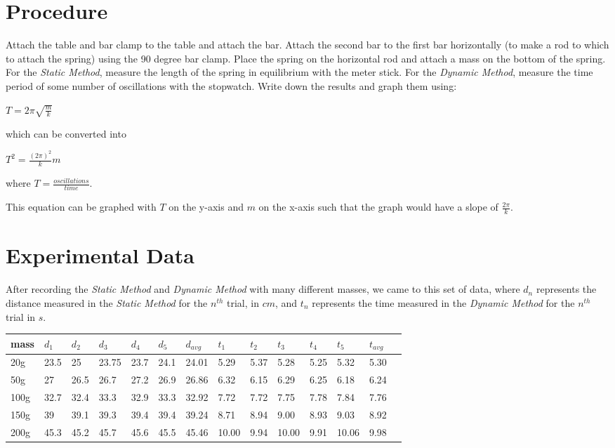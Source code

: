 \documentclass{article}
\begin{document}
\section{Procedure}
Attach the table and bar clamp to the table and attach the bar. Attach the second bar to the first bar horizontally (to make a rod to which to attach the spring) using the 90 degree bar clamp. Place the spring on the horizontal rod and attach a mass on the bottom of the spring. For the \emph{Static Method}, measure the length of the spring in equilibrium with the meter stick. For the \emph{Dynamic Method}, measure the time period of some number of oscillations with the stopwatch. Write down the results and graph them using:

\begin{center}$T=2\pi\sqrt{\frac{m}{k}}$\end{center}

	which can be converted into
	
\begin{center}$T^{2}=\frac{(2\pi)^{2}}{k}m$\end{center}

where $T=\frac{oscillations}{time}$.

This equation can be graphed with $T$ on the y-axis and $m$ on the x-axis such that the graph would have a slope of $\frac{2\pi}{k}$.

\section{Experimental Data}
After recording the \emph{Static Method} and \emph{Dynamic Method} with
	many different masses, we came to this set of data, where $d_{n}$ represents the distance measured in the \emph{Static Method} for the $n^{th}$ trial, in $cm$, and $t_{n}$ represents the time measured in the \emph{Dynamic Method} for the $n^{th}$  trial in $s$.

\begin{center}
\begin{table}[h]
\begin{tabular}{|l|l|l|l|l|l|l|l|l|l|l|l|l|l|}
\hline
mass & $d_1$ & $d_2$ & $d_3$ & $d_4$ & $d_5$ & $d_{avg}$ & $t_1$ & $t_2$ & $t_3$ & $t_4$ & $t_5$ & $t_{avg}$ \\ \hline 
20g & 23.5 & 25 & 23.75 & 23.7 & 24.1 & 24.01 & 5.29 & 5.37 & 5.28 & 5.25 & 5.32 & 5.30 \\ \hline
50g & 27 & 26.5 & 26.7 & 27.2 & 26.9 & 26.86 & 6.32 & 6.15 & 6.29 & 6.25 & 6.18 & 6.24 \\ \hline
100g & 32.7 & 32.4 & 33.3 & 32.9 & 33.3 & 32.92 & 7.72 & 7.72 & 7.75 & 7.78 & 7.84 & 7.76 \\ \hline
150g & 39 & 39.1 & 39.3 & 39.4 & 39.4 & 39.24 & 8.71 & 8.94 & 9.00 & 8.93 & 9.03 & 8.92 \\ \hline
200g & 45.3 & 45.2 & 45.7 & 45.6 & 45.5 & 45.46 & 10.00 & 9.94 & 10.00 & 9.91 & 10.06 & 9.98 \\ \hline

\end{tabular}
\end{table}
\end{center}
\end{document}
